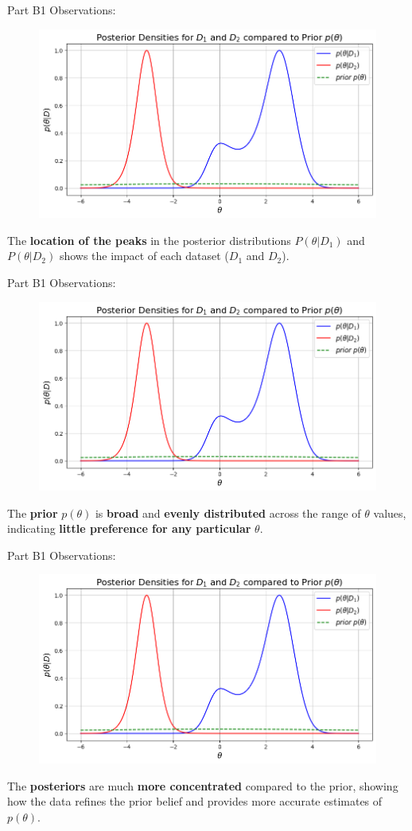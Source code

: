 \documentclass{beamer}
\begin{document}
    \begin{frame}{Part B1}
    Observations:
    \begin{figure}
        \centering
        \includegraphics[width=0.75\linewidth]{B1.png}
        \label{Graph B1}
    \end{figure}
    The \textbf{location of the peaks} in the posterior distributions $P(\theta|D_1)$ and $P(\theta|D_2)$ shows the impact of each dataset ($D_1$ and $D_2$).
    \end{frame}

    \begin{frame}{Part B1}
    Observations:
    \begin{figure}
        \centering
        \includegraphics[width=0.75\linewidth]{B1.png}
        \label{Graph B1}
    \end{figure}
    The \textbf{prior} $p(\theta)$ is \textbf{broad} and \textbf{evenly distributed} across the range of $\theta$ values, indicating \textbf{little preference for any particular} $\theta$.
    \end{frame}
    
    \begin{frame}{Part B1}
    Observations:
    \begin{figure}
        \centering
        \includegraphics[width=0.75\linewidth]{B1.png}
        \label{Graph B1}
    \end{figure}
    The \textbf{posteriors} are much \textbf{more concentrated} compared to the prior, showing how the data refines the prior belief and provides more accurate estimates of $p(\theta)$.
    \end{frame}
\end{document}
